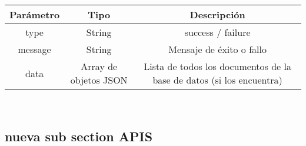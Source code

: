 \documentclass[a4paper,12pt]{article}
\begin{document}
\begin{tabular}{|c|c|c|}
    \hline
    \textbf{Parámetro} & \textbf{Tipo}  & \textbf{Descripción}\\ 
    \hline
    type & String & success / failure\\ 
    \hline
    message & String & Mensaje de éxito o fallo\\ 
    \hline
    data & Array de objetos JSON & Lista de todos los documentos de la base de datos (si los encuentra)\\ 
    \hline
\end{tabular}\\

\subsection{nueva sub section APIS}
\end{document}
